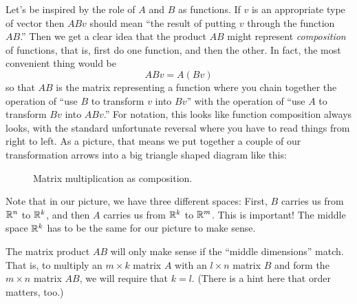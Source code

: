 \documentclass[elementsmain.tex]{subfiles}
\begin{document}
Let's be inspired by the role of $A$ and $B$ as functions. If $v$ is an appropriate type of vector then $ABv$ should mean ``the result of putting $v$ through the function $AB$.'' Then we get a clear idea that the product $AB$ might represent \emph{composition} of functions, that is, first do one function, and then the other. In fact, the most convenient thing would be
\[
ABv = A ( Bv)
\]
so that $AB$ is the matrix representing a function where you chain together the operation of ``use $B$ to transform $v$ into $Bv$'' with the operation of ``use $A$ to transform $Bv$ into $ABv$.'' For notation, this looks like function composition always looks, with the standard unfortunate reversal where you have to read things from right to left. As a picture, that means we put together a couple of our transformation arrows into a big triangle shaped diagram like this:
\begin{figure}[h!]
\centering
{}
\caption{Matrix multiplication as composition.}
\label{fig:22-comm-diag}
\end{figure}

Note that in our picture, we have three different spaces: First, $B$ carries us from $\mathbb{R}^n$ to $\mathbb{R}^k$, and then $A$ carries us from $\mathbb{R}^k$ to $\mathbb{R}^m$. This is important! The middle space $\mathbb{R}^k$ has to be the same for our picture to make sense. 

\begin{remark} The matrix product $AB$ will only make sense if the ``middle dimensions'' match. That is, to multiply an $m\times k$ matrix $A$ with an $l\times n$ matrix $B$ and form the $m\times n$ matrix $AB$, we will require that $k=l$. (There is a hint here that order matters, too.)
\end{remark}
\end{document}
